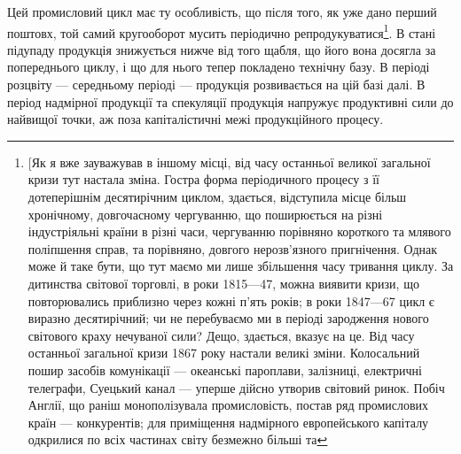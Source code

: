 Цей промисловий цикл має ту особливість, що після того, як уже дано перший
поштовх, той самий кругооборот мусить періодично репродукуватися\footnote{
[Як я вже зауважував в іншому місці, від часу останньої великої загальної кризи тут настала
зміна. Гостра форма періодичного процесу з її дотеперішнім десятирічним циклом, здається, відступила
місце більш хронічному, довгочасному чергуванню, що поширюється на різні індустріяльні країни в
різні
часи, чергуванню порівняно короткого та млявого поліпшення справ, та порівняно, довгого
нерозв'язного
пригнічення. Однак може й таке бути, що тут маємо ми лише збільшення часу тривання циклу. За
дитинства
світової торговлі, в роки 1815—47, можна виявити кризи, що повторювались приблизно через
кожні п’ять років; в роки 1847—67 цикл є виразно десятирічний; чи не перебуваємо ми в періоді
зародження нового світового краху нечуваної сили? Дещо, здається, вказує на це. Від часу останньої
загальної кризи 1867 року настали великі зміни. Колосальний пошир засобів комунікації — океанські
пароплави,
залізниці, електричні телеграфи, Суецький канал — уперше дійсно утворив світовий ринок. Побіч
Англії, що раніш монополізувала промисловість, постав ряд промислових країн — конкурентів; для
приміщення надмірного европейського капіталу одкрилися по всіх частинах світу безмежно більші та
}. В стані
підупаду продукція знижується нижче від того щабля, що його вона досягла
за попереднього циклу, і що для нього тепер покладено технічну базу. В періоді
розцвіту — середньому періоді — продукція розвивається на цій базі далі. В період
надмірної продукції та спекуляції продукція напружує продуктивні сили до найвищої
точки, аж поза капіталістичні межі продукційного процесу.